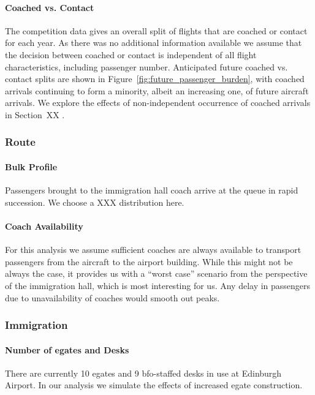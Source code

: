 \documentclass[10pt]{article}
\begin{document}
\paragraph{Coached vs. Contact}
The competition data gives an overall split of flights that are coached or contact for each year. As there was no additional information available we assume that the decision between coached or contact is independent of all flight characteristics, including passenger number. Anticipated future coached vs. contact splits are shown in Figure~\ref{fig:future_passenger_burden}, with coached arrivals continuing to form a minority, albeit an increasing one, of future aircraft arrivals. We explore the effects of non-independent occurrence of coached arrivals in Section~XX .


\subsubsection{Route}

\paragraph{Bulk Profile} 
 Passengers  brought to the immigration hall coach arrive at the queue in rapid succession. We choose a XXX distribution  here.

\paragraph{Coach Availability}
For this analysis we assume sufficient coaches are always available to transport passengers from the aircraft to the airport building. While this might not be always the case, it provides us with a ``worst case'' scenario from the perspective of the immigration hall, which is most interesting for us. Any delay in passengers due to unavailability of coaches would smooth out peaks.  


\subsubsection{Immigration}

\paragraph{Number of \glspl{egate} and Desks} There are currently 10 \glspl{egate} and 9 \gls{bfo}-staffed desks in use at Edinburgh Airport. In our analysis we simulate the effects of increased \gls{egate} construction.
\end{document}
